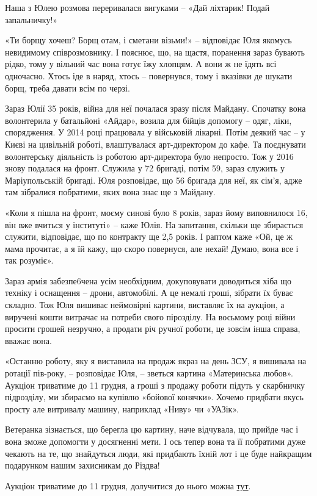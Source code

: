 Наша з Юлею розмова переривалася вигуками – «Дай ліхтарик! Подай запальничку!»

«Ти борщу хочеш? Борщ отам, і сметани візьми!» – відповідає Юля якомусь
невидимому співрозмовнику. І пояснює, що, на щастя, поранення зараз бувають
рідко, тому у вільний час вона готує їжу хлопцям. А вони ж не їдять всі
одночасно. Хтось іде в наряд, хтось – повернувся, тому і вказівки де шукати
борщ, треба давати всім по черзі.

Зараз Юлії 35 років, війна для неї почалася зразу після Майдану. Спочатку вона
волонтерила у батальйоні «Айдар», возила для бійців допомогу – одяг, ліки,
спорядження. У 2014 році працювала у військовій лікарні. Потім деякий час – у
Києві на цивільній роботі, влаштувалася арт-директором до кафе. Та поєднувати
волонтерську діяльність із роботою арт-директора було непросто. Тож у 2016
знову подалася на фронт. Служила у 72 бригаді, потім  59, зараз служить у
Маріупольській бригаді. Юля розповідає, що 56 бригада для неї, як сім’я, адже
там зібралися побратими, яких вона знає ще з Майдану.


«Коли я пішла на фронт, моєму синові було 8 років, зараз йому виповнилося 16,
він вже вчиться у інституті» – каже Юлія. На запитання, скільки ще збирається
служити, відповідає, що по контракту ще 2,5 років. І раптом каже «Ой, це ж мама
прочитає, а я їй кажу, що скоро повернуся, але нехай! Думаю, вона все і так
розуміє».

Зараз армія забезпе6чена усім необхідним, докуповувати доводиться хіба що
техніку і оснащення – дрони, автомобілі. А це немалі гроші, зібрати їх буває
складно. Тож Юля вишиває неймовірні картини, виставляє їх на аукціон, а
виручені кошти витрачає на потреби свого пірозділу. На восьмому році війни
просити грошей незручно, а продати річ ручної роботи, це зовсім інша справа,
вважає вона.

«Останню роботу, яку я виставила на продаж якраз на день ЗСУ, я вишивала на
ротації пів-року, – розповідає Юля, – зветься картина «Материнська любов».
Аукціон триватиме до 11 грудня, а гроші з продажу роботи підуть у скарбничку
підрозділу, ми збираємо на купівлю «бойової конячки». Хочемо придбати якусь
просту але витривалу машину, наприклад «Ниву» чи «УАЗік».

Ветеранка зізнається, що берегла цю картину, наче відчувала, що прийде час і
вона зможе допомогти у досягненні мети. І ось тепер вона та її побратими дуже
чекають на те, що знайдуться люди, які придбають їхній лот і це буде найкращим
подарунком нашим захисникам до Різдва!

Аукціон триватиме до 11 грудня, долучитися до нього можна
\href{https://www.facebook.com/100004442853474/posts/2056104344547641/}{тут}.
